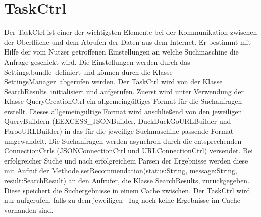 
\section{TaskCtrl}

Der TaskCtrl ist einer der wichtigsten Elemente bei der Kommunikation zwischen der Oberfläche und dem Abrufen der Daten aus dem Internet. Er bestimmt mit Hilfe der vom Nutzer getroffenen Einstellungen an welche Suchmaschine die Anfrage geschickt wird. Die Einstellungen werden durch das \glqq Settings.bundle\grqq\ definiert und können durch die Klasse \glqq SettingsManager\grqq\ abgerufen werden. Der TaskCtrl wird von der Klasse \glqq SearchResults\grqq\ initialisiert und aufgerufen. Zuerst wird unter Verwendung der Klasse \glqq QueryCreationCtrl \grqq\xspace ein allgemeingültiges Format für die Suchanfragen erstellt. Dieses allgemeingültige Format wird anschließend von den jeweiligen \glqq QueryBuildern \grqq\xspace (EEXCESS_JSONBuilder, DuckDuckGoURLBuilder und FarooURLBuilder) in das für die jeweilige Suchmaschine passende Format umgewandelt. Die Suchanfragen werden asynchron durch die entsprechenden \glqq ConnectionCtrls \grqq\xspace (JSONConnectionCtrl und URLConnectionCtrl) versendet. Bei erfolgreicher Suche und nach erfolgreichem Parsen der Ergebnisse werden diese mit Aufruf der Methode \glqq setRecommendation(status:String, message:String, result:SearchResult) \grqq\xspace an den Aufrufer, die Klasse SearchResults, zurückgegeben. Diese speichert die Suchergebnisse in einem Cache zwischen. Der TaskCtrl wird nur aufgerufen, falls zu dem jeweiligen \SEARCH-Tag noch keine Ergebnisse im Cache vorhanden sind. 

